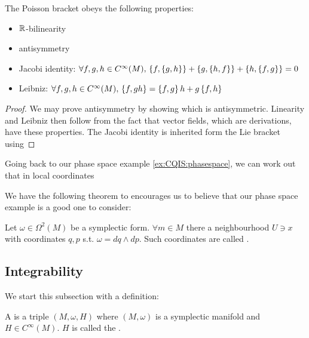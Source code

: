 \documentclass{article}
\begin{document}
\begin{prop}
The Poisson bracket obeys the following properties:
\begin{itemize}
    \item $\mbb{R}$-bilinearity
    \item antisymmetry
    \item Jacobi identity: $\forall f,g,h \in C^\infty(M), \, \acomm[f]{\acomm[g]{h}} + \acomm[g]{\acomm[h]{f}} + \acomm[h]{\acomm[f]{g}} = 0$
    \item Leibniz: $\forall f, g, h\in C^\infty(M), \, \acomm[f]{gh} = \acomm[f]{g}h + g\acomm[f]{h}$
\end{itemize}
\end{prop}
\begin{proof}
We may prove antisymmetry by showing 
which is antisymmetric. Linearity and Leibniz then follow from the fact that vector fields, which are derivations, have these properties. The Jacobi identity is inherited form the Lie bracket using 
\end{proof}

\begin{example}
Going back to our phase space example \ref{ex:CQIS:phasespace}, we can work out that in local coordinates
\end{example}

We have the following theorem to encourages us to believe that our phase space example is a good one to consider:

\begin{theorem}
Let $\omega\in \Omega^2(M)$ be a symplectic form. $\forall m \in M$ there a neighbourhood $U \ni x$ with coordinates $q,p$ s.t. $\omega = dq \wedge dp$. Such coordinates are called . 
\end{theorem}


\subsection{Integrability}

We start this subsection with a definition:

\begin{definition}
A  is a triple $(M,\omega,H)$ where $(M,\omega)$ is a symplectic manifold and $H \in C^\infty(M)$. $H$ is called the . 
\end{definition}
\end{document}
